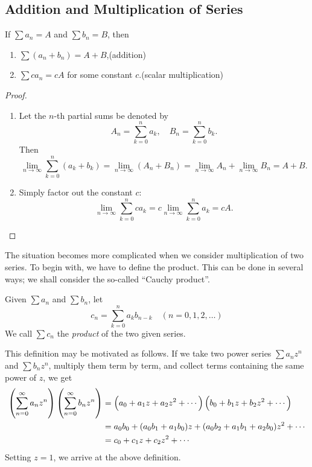 \subsection{Addition and Multiplication of Series}
\begin{proposition}
If $\sum a_n=A$ and $\sum b_n=B$, then
\begin{enumerate}[label=(\roman*)]
\item $\sum(a_n+b_n)=A+B$,\hfill(addition)
\item $\sum ca_n=cA$ for some constant $c$.\hfill(scalar multiplication)
\end{enumerate}
\end{proposition}

\begin{proof} \
\begin{enumerate}[label=(\roman*)]
\item Let the $n$-th partial sums be denoted by
\[A_n=\sum_{k=0}^{n}a_k,\quad B_n=\sum_{k=0}^{n}b_k.\]
Then
\[\lim_{n\to\infty}\sum_{k=0}^{n}(a_k+b_k)=\lim_{n\to\infty}(A_n+B_n)=\lim_{n\to\infty}A_n+\lim_{n\to\infty}B_n=A+B.\]
\item Simply factor out the constant $c$:
\[\lim_{n\to\infty}\sum_{k=0}^{n}ca_k=c\lim_{n\to\infty}\sum_{k=0}^{n}a_k=cA.\]
\end{enumerate}
\end{proof}

The situation becomes more complicated when we consider multiplication of two series. To begin with, we have to define the product. This can be done in several ways; we shall consider the so-called ``Cauchy product''. 

\begin{definition}
Given $\sum a_n$ and $\sum b_n$, let
\[c_n=\sum_{k=0}^{n}a_k b_{n-k}\quad(n=0,1,2,\dots)\]
We call $\sum c_n$ the \emph{product} of the two given series.
\end{definition}

This definition may be motivated as follows. If we take two power series $\sum a_nz^n$ and $\sum b_nz^n$, multiply them term by term, and collect terms containing the same power of $z$, we get
\begin{align*}
\left(\sum_{n=0}^{\infty}a_nz^n\right)\left(\sum_{n=0}^{\infty}b_nz^n\right)
&=\left(a_0+a_1z+a_2z^2+\cdots\right)\left(b_0+b_1z+b_2z^2+\cdots\right)\\
&=a_0b_0+(a_0b_1+a_1b_0)z+(a_0b_2+a_1b_1+a_2b_0)z^2+\cdots\\
&=c_0+c_1z+c_2z^2+\cdots
\end{align*}
Setting $z=1$, we arrive at the above definition.

